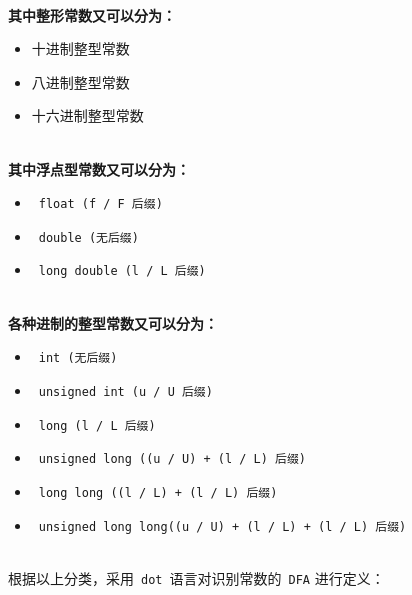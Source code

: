 \documentclass[lang=cn,11pt,a4paper]{paper}
\begin{document}
~\\
\textbf{其中整形常数又可以分为：}
\begin{itemize}
    \item 十进制整型常数
    \item 八进制整型常数
    \item 十六进制整型常数
\end{itemize}
~\\
\textbf{其中浮点型常数又可以分为：}
\begin{itemize}
    \item\ \lstinline{float (f / F 后缀)}
    \item\ \lstinline{double (无后缀)}
    \item\ \lstinline{long double (l / L 后缀)}
\end{itemize}
~\\
\textbf{各种进制的整型常数又可以分为：}
\begin{itemize}
    \item\ \lstinline{int (无后缀)}
    \item\ \lstinline{unsigned int (u / U 后缀)}
    \item\ \lstinline{long (l / L 后缀)}
    \item\ \lstinline{unsigned long ((u / U) + (l / L) 后缀)}
    \item\ \lstinline{long long ((l / L) + (l / L) 后缀)}
    \item\ \lstinline{unsigned long long((u / U) + (l / L) + (l / L) 后缀)}
\end{itemize}
~\\

根据以上分类，采用\ \lstinline{dot}\ 语言对识别常数的\ \lstinline{DFA} 进行定义：
\end{document}
